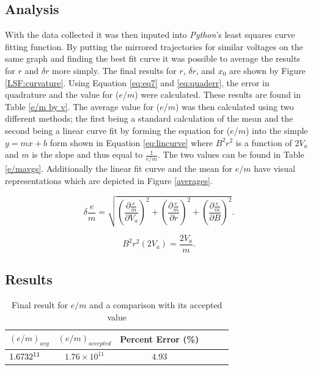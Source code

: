 \documentclass[prb,preprint]{revtex4-1}
\begin{document}
\subsection{Analysis}

With the data collected it was then inputed into \textit{Python}'s least squares curve fitting function. By putting the mirrored trajectories for similar voltages on the same graph and finding the best fit curve it was possible to average the results for $r$ and $\delta r$ more simply. The final results for $r$, $\delta r$, and $x_0$ are shown by Figure \ref{LSF:curvature}.
	Using Equation \eqref{eq:eq7} and \eqref{eq:quaderr}, the error in quadrature and the value for ($e$/$m$) were calculated. These results are found in Table \ref{e/m by v}. The average value for ($e$/$m$) was then calculated using two different methods; the first being a standard calculation of the mean and the second being a linear curve fit by forming the equation for ($e$/$m$) into the  simple $y=mx+b$ form shown in Equation \eqref{eq:lincurve} where $B^2r^2$ is a function of $2V_a$ and $m$ is the slope and thus equal to $\frac{1}{e/m}$. The two values can be found in Table \ref{e/mavgs}. Additionally the linear fit curve and the mean for $e/m$ have visual representations which are depicted in Figure \ref{averages}.
	
	\begin{equation}
		\label{eq:quaderr}
		\delta \frac{e}{m}
		=
		\sqrt{
		\left(\frac{\partial \frac{e}{m}}{\partial V_a}\right)^2+
		\left(\frac{\partial \frac{e}{m}}{\partial r}\right)^2+
		\left(\frac{\partial \frac{e}{m}}{\partial B}\right)^2
		}.
	\end{equation}
	
	\begin{equation}
		\label{eq:lincurve}
		B^2r^2(2V_a) = \frac{2V_a}{m}.
	\end{equation}

\newpage

\subsection{Results}

	\begin{table}[h!]
		\centering
		\caption{Final result for $e/m$ and a comparison with its accepted value}
		\begin{ruledtabular}
		\begin{tabular}{l c c c c p{5cm}}
		$(e/m)_{avg}$ & $(e/m)_{accepted}$ & Percent Error (\%)\\
		\hline
		$1.6732\time10^{11}$ & $1.76\times10^{11}$ & 4.93\\
		\end{tabular}
		\end{ruledtabular}
		\label{final results}
	\end{table}
\end{document}
